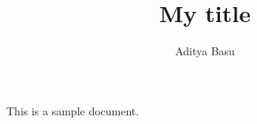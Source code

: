 \documentclass{article}
\title{My title}
\author{Aditya Basu}
\begin{document}
\maketitle

This is a sample document.
\end{document}

